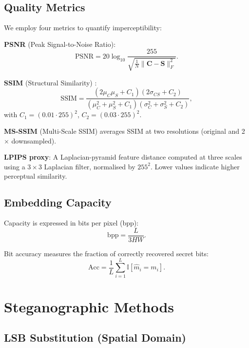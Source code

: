 \documentclass[conference]{IEEEtran}
\begin{document}
\subsection{Quality Metrics}

We employ four metrics to quantify imperceptibility:

\textbf{PSNR} (Peak Signal-to-Noise Ratio):
\begin{equation}
\text{PSNR} = 20 \log_{10}\frac{255}{\sqrt{\frac{1}{N}\|\mathbf{C}-\mathbf{S}\|_F^2}}.
\label{eq:psnr}
\end{equation}

\textbf{SSIM} (Structural Similarity) \cite{17}:
\begin{equation}
\text{SSIM} = \frac{(2\mu_C\mu_S + C_1)(2\sigma_{CS} + C_2)}{(\mu_C^2+\mu_S^2+C_1)(\sigma_C^2+\sigma_S^2+C_2)},
\label{eq:ssim}
\end{equation}
with $C_1 = (0.01\cdot255)^2$, $C_2 = (0.03\cdot255)^2$.

\textbf{MS-SSIM} (Multi-Scale SSIM) averages SSIM at two resolutions (original and 2$\times$ downsampled).

\textbf{LPIPS proxy}: A Laplacian-pyramid feature distance computed at three scales using a $3\times3$ Laplacian filter, normalised by $255^2$. Lower values indicate higher perceptual similarity.

\subsection{Embedding Capacity}

Capacity is expressed in bits per pixel (bpp):
\begin{equation}
\text{bpp} = \frac{L}{3 H W}.
\label{eq:bpp}
\end{equation}

Bit accuracy measures the fraction of correctly recovered secret bits:
\begin{equation}
\text{Acc} = \frac{1}{L}\sum_{i=1}^L \mathbb{I}[\hat{m}_i = m_i].
\label{eq:acc}
\end{equation}

\section{Steganographic Methods}
\label{sec:methods}

\subsection{LSB Substitution (Spatial Domain)}
\end{document}
